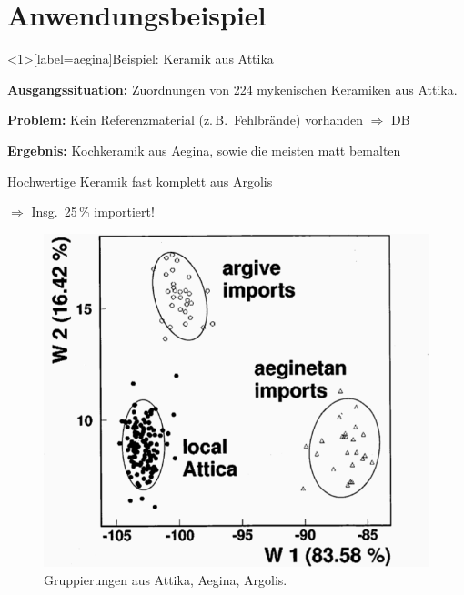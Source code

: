 \documentclass[xcolor=x11names, aspectratio=169]{beamer}
\begin{document}
\section{Anwendungsbeispiel}

\begin{frame}<1>[label=aegina]{Beispiel: Keramik aus Attika}
\begin{minipage}{0.45\textwidth}\flushleft


\textbf{Ausgangssituation:} Zuordnungen von 224 mykenischen Keramiken aus Attika.\medskip\pause

\textbf{Problem:} Kein Referenzmaterial (z.\,B.\ Fehlbrände) vorhanden $\Rightarrow$ DB\medskip

\textbf{Ergebnis:} Kochkeramik aus Aegina,
sowie die meisten matt bemalten\medskip

Hochwertige Keramik fast komplett aus Argolis\medskip

\alert{$\Rightarrow$ Insg.\ 25\,\% importiert!}
\end{minipage}\hfill
\begin{minipage}{0.51\textwidth}
\begin{figure}
\includegraphics[width=.9\textwidth]{img/aegina.png}
\caption{Gruppierungen aus Attika, Aegina, Argolis. \cite{mommsen2003}}
\end{figure}
\end{minipage}
\end{frame}
\end{document}
